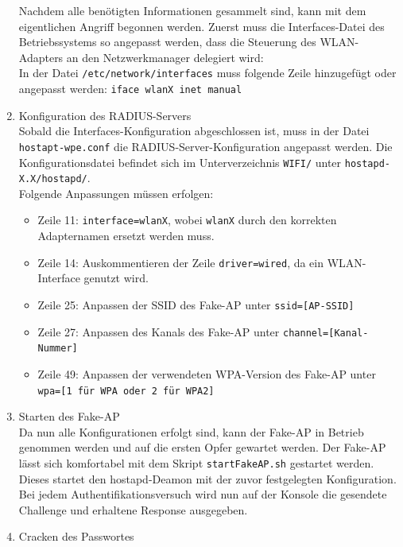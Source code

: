 \begin{enumerate}
	Nachdem alle benötigten Informationen gesammelt sind, kann mit dem eigentlichen Angriff begonnen werden. Zuerst muss die Interfaces-Datei des Betriebssystems so angepasst werden, dass die Steuerung des WLAN-Adapters an den Netzwerkmanager delegiert wird: \\
	In der Datei \colorbox{altgray}{\lstinline|/etc/network/interfaces|} muss folgende Zeile hinzugefügt oder angepasst werden: \colorbox{altgray}{\lstinline|iface wlanX inet manual|}
	\item {Konfiguration des RADIUS-Servers}\\
	Sobald die Interfaces-Konfiguration abgeschlossen ist, muss in der Datei \colorbox{altgray}{\lstinline|hostapt-wpe.conf|} die RADIUS-Server-Konfiguration angepasst werden. Die Konfigurationsdatei befindet sich im Unterverzeichnis \colorbox{altgray}{\lstinline|WIFI/|} unter \colorbox{altgray}{\lstinline|hostapd-X.X/hostapd/|}.\\
	Folgende Anpassungen müssen erfolgen: \\
	\begin{itemize}
		\item Zeile 11: \colorbox{altgray}{\lstinline|interface=wlanX|}, wobei \colorbox{altgray}{\lstinline|wlanX|} durch den korrekten Adapternamen ersetzt werden muss.
		\item Zeile 14: Auskommentieren der Zeile \colorbox{altgray}{\lstinline|driver=wired|}, da ein WLAN-Interface genutzt wird.
		\item Zeile 25: Anpassen der SSID des Fake-AP unter \colorbox{altgray}{\lstinline|ssid=[AP-SSID]|}
		\item Zeile 27: Anpassen des Kanals des Fake-AP unter \colorbox{altgray}{\lstinline|channel=[Kanal-Nummer]|}
		\item Zeile 49: Anpassen der verwendeten WPA-Version des Fake-AP unter \colorbox{altgray}{\lstinline|wpa=[1 für WPA oder 2 für WPA2]|}
	\end{itemize}
	\item {Starten des Fake-AP}\\
	Da nun alle Konfigurationen erfolgt sind, kann der Fake-AP in Betrieb genommen werden und auf die ersten Opfer gewartet werden. Der Fake-AP lässt sich komfortabel mit dem Skript \colorbox{altgray}{\lstinline|startFakeAP.sh|} gestartet werden. Dieses startet den hostapd-Deamon mit der zuvor festgelegten Konfiguration. Bei jedem Authentifikationsversuch wird nun auf der Konsole die gesendete Challenge und erhaltene Response ausgegeben.
	\item {Cracken des Passwortes}\\

\end{enumerate}
